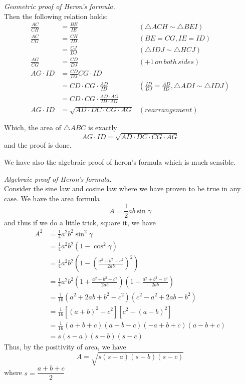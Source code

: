 \documentclass[12pt]{article}
\renewenvironment{proof}[1][Proof]{\begin{snugshade*} \textit{{#1}.}\\}{\hfill \qedsymbol \end{snugshade*}}
\begin{document}
\begin{proof}[Geometric proof of Heron's formula]
        Then the following relation holds:\begin{align*}
            \frac{AC}{CH}&=\frac{BE}{IE}&(\triangle ACH \sim \triangle BEI)\\
            \frac{AC}{CG}&=\frac{CH}{ID}&(BE=CG,IE=ID)\\
            &=\frac{CJ}{DJ}&(\triangle IDJ \sim \triangle HCJ)\\
            \frac{AG}{CG}&=\frac{CD}{DJ}&(+1\, on\, both\, sides)\\
            AG\cdot ID&=\frac{CD}{DJ}CG\cdot ID\\
            &=CD\cdot CG\cdot \frac{AD}{ID}&(\frac{ID}{DJ}=\frac{AD}{ID},\triangle ADI\sim\triangle IDJ)\\
            &=CD\cdot CG\cdot \frac{AD\cdot AG}{ID\cdot AG}\\
            AG\cdot ID&=\sqrt{AD\cdot DC\cdot CG\cdot AG}&(rearrangement)
        \end{align*}

        Which, the area of $\triangle ABC$ is exactly $$AG\cdot ID=\sqrt{AD\cdot DC\cdot CG\cdot AG}$$ and the proof is done.
    \end{proof}

    We have also the algebraic proof of heron's formula which is much sensible.

    \begin{proof}[Algebraic proof of Heron's formula]
        Consider the sine law and cosine law where we have proven to be true in any case. We have the area formula $$A=\frac{1}{2}ab\sin{\gamma}$$ and thus if we do a little trick, square it, we have \begin{align*}
            A^2&=\frac{1}{4}a^2b^2\sin^2{\gamma}\\
            &=\frac{1}{4}a^2b^2(1-\cos^2{\gamma})\\
            &=\frac{1}{4}a^2b^2(1-(\frac{a^2+b^2-c^2}{2ab})^2)\\
            &=\frac{1}{4}a^2b^2(1+\frac{a^2+b^2-c^2}{2ab})(1-\frac{a^2+b^2-c^2}{2ab})\\
            &=\frac{1}{16}(a^2+2ab+b^2-c^2)(c^2-a^2+2ab-b^2)\\
            &=\frac{1}{16}[(a+b)^2-c^2][c^2-(a-b)^2]\\
            &=\frac{1}{16}(a+b+c)(a+b-c)(-a+b+c)(a-b+c)\\
            &=s(s-a)(s-b)(s-c)
        \end{align*}
        Thus, by the positivity of area, we have $$A=\sqrt{s(s-a)(s-b)(s-c)}$$ where $s=\dfrac{a+b+c}{2}$
    \end{proof}
\end{document}
